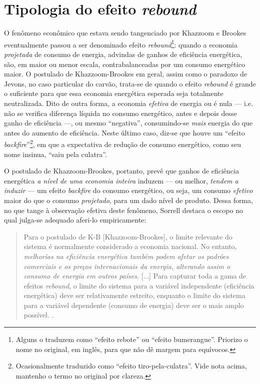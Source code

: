 \section{Tipologia do efeito \textit{rebound}}
O fenômeno econômico que estava sendo tangenciado por Khazzoom e Brookes eventualmente passou a ser denominado efeito \textit{rebound}\footnote{Alguns o traduzem como ``efeito rebote'' ou ``efeito bumerangue''. Priorizo o nome no original, em inglês, para que não dê margem para equívocos.}: quando a economia \textit{projetada} de consumo de energia, advindas de ganhos de eficiência energética, são, em maior ou menor escala, contrabalanceadas por um consumo energético maior. O postulado de Khazzoom-Brookes em geral, assim como o paradoxo de Jevons, no caso particular do carvão, trata-se de quando o efeito \textit{rebound} é grande o suficiente para que essa economia energética esperada seja totalmente neutralizada. Dito de outra forma, a economia \textit{efetiva} de energia ou é nula --- i.e. não se verifica diferença líquida no consumo energético, antes e depois desse ganho de eficiência ---, ou mesmo ``negativa'', consumindo-se \textit{mais} energia do que antes do aumento de eficiência. Neste último caso, diz-se que houve um ``efeito \textit{backfire}''\footnote{Ocasionalmente traduzido como ``efeito tiro-pela-culatra''. Vide nota acima, mantenho o termo no original por clareza.}, em que a expectativa de redução de consumo energético, como seu nome insinua, ``saiu pela culatra''.

O postulado de Khazzoom-Brookes, portanto, prevê que ganhos de eficiência energética \textit{a nível de uma economia inteira} induzem --- ou melhor, \textit{tendem a induzir} --- um efeito \textit{backfire} do consumo energético, ou seja, um consumo \textit{efetivo} maior do que o consumo \textit{projetado}, para um dado nível de produto. Dessa forma, no que tange à observação efetiva deste fenômeno, Sorrell destaca o escopo no qual julga-se adequado aferi-lo empiricamente: 
\begin{quote}
    Para o postulado de K-B [Khazzoom-Brookes], o limite relevante do sistema é normalmente considerado a economia nacional. No entanto, \textit{melhorias na eficiência energética também podem afetar os padrões comerciais e os preços internacionais da energia, alterando assim o consumo de energia em outros países}. [...] Para capturar toda a gama de efeitos \textit{rebound}, o limite do sistema para a variável independente (eficiência energética) deve ser relativamente estreito, enquanto o limite do sistema para a variável dependente (consumo de energia) deve ser o mais amplo possível. \parencite[p. 15, grifo meu]{Sorrell2007}.
\end{quote}


